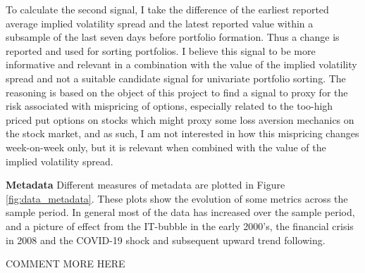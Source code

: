To calculate the second signal, I take the difference of the earliest reported average implied volatility spread and the latest reported value within a subsample of the last seven days before portfolio formation. Thus a change is reported and used for sorting portfolios. I believe this signal to be more informative and relevant in a combination with the value of the implied volatility spread and not a suitable candidate signal for univariate portfolio sorting. The reasoning is based on the object of this project to find a signal to proxy for the risk associated with mispricing of options, especially related to the too-high priced put options on stocks which might proxy some loss aversion mechanics on the stock market, and as such, I am not interested in how this mispricing changes week-on-week only, but it is relevant when combined with the value of the implied volatility spread.

\textbf{Metadata} Different measures of metadata are plotted in Figure \ref{fig:data_metadata}. These plots show the evolution of some metrics across the sample period. In general most of the data has increased over the sample period, and a  picture of effect from the IT-bubble in the early 2000's, the financial crisis in 2008 and the COVID-19 shock and subsequent upward trend following.

COMMENT MORE HERE


